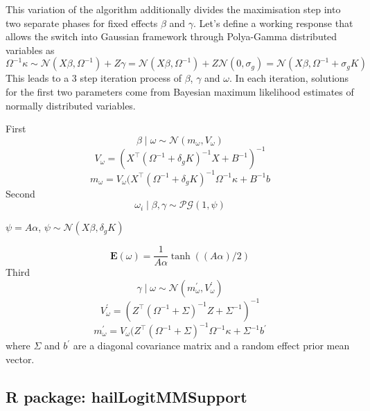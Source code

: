 \documentclass [12pt,a4paper]{report}
\begin{document}
This variation of the algorithm additionally divides the maximisation step into two separate phases for fixed effects $\beta$ and $\gamma$. Let's define a working response that allows the switch into Gaussian framework through Polya-Gamma distributed variables as \[ \Omega^{-1}\kappa \sim \mathcal{N}(X\beta,\Omega^{-1}) +Z\gamma = 
 \mathcal{N}(X\beta,\Omega^{-1}) +Z\mathcal{N}(0,\sigma_g) =  \mathcal{N}(X\beta,\Omega^{-1} +\sigma_g K) \] This leads to a 3 step iteration process of $\beta$, $\gamma$ and $\omega$. In each iteration, solutions for the first two parameters come from Bayesian maximum likelihood estimates of normally distributed variables. \par 
 First 
 \[  \beta \mid \omega  \sim \mathcal{N}(m_\omega,V_\omega)  \] 
  \[ V_\omega = (X^{\intercal} (\Omega^{-1}+\delta_g K)^{-1} X + B^{-1})^{-1}  \]  
   \[ m_\omega = V_\omega(X^{\intercal} (\Omega^{-1}+\delta_g K)^{-1}\Omega^{-1} \kappa +  B^{-1}b \] 
Second
    \[  \omega_i \mid \beta,\gamma  \sim \mathcal{PG}(1,\psi)  \]
         \begin{center}
         
      \(  \psi = A\alpha  \),    \(  \psi \sim \mathcal{N}(X\beta,\delta_g K)  \)
  \end{center}  
   \[\mathbf{E}(\omega)=\frac{1}{A\alpha}\tanh((A\alpha)/2)\] 
 Third
  \[   \gamma \mid \omega  \sim \mathcal{N}(m^{\prime}_\omega,V^{\prime}_\omega)  \] 
  \[ V^{\prime}_\omega= (Z^{\intercal} (\Omega^{-1}+\Sigma)^{-1} Z + \Sigma^{-1})^{-1}  \]  
   \[ m^{\prime}_\omega = V_\omega(Z^{\intercal} (\Omega^{-1}+\Sigma)^{-1}\Omega^{-1} \kappa +  \Sigma^{-1}b^{\prime} \]
   where $\Sigma$ and $b^{\prime}$ are a diagonal covariance matrix and a random effect prior mean vector.
    

\subsection*{R package: hailLogitMMSupport }
\end{document}
